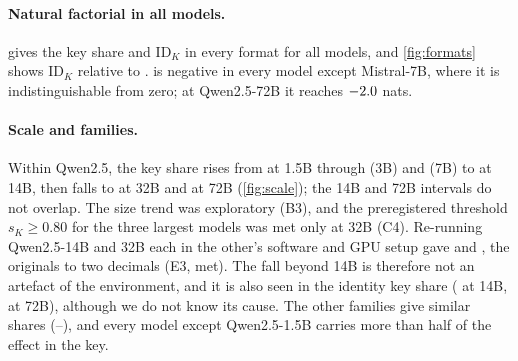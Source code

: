 \paragraph{Natural factorial in all models.}  gives the \fmtOpt{} key share and $\mathrm{ID}_K$ in every format for all \nModels{} models, and \cref{fig:formats} shows $\mathrm{ID}_K$ relative to \fmtOpt{}. \fmtBefore{} is negative in every model except Mistral-7B, where it is indistinguishable from zero; at Qwen2.5-72B it reaches $-2.0$ nats.

\begin{table}[!ht]
\centering
\caption{\textbf{Natural factorial, all models.} Key share $s_K$ under \fmtOpt{} and value identity carried by keys, $\mathrm{ID}_K$ (nats), in each format, with keys and values clamped from layer~0. $n = 150$ stories per format and model; 95\% bootstrap CIs over stories (ratio recomputed in each resample for $s_K$). Models ordered by size. Rows up to 14B are from GPU stage 1, whose predictions B1--B2 cover \fmtOpt{}, \fmtLetter{} and \fmtNone{} in Qwen2.5-3B/7B, Qwen3-8B, Mistral-7B and OLMo-2-7B; rows from 24B are from stage 2, whose prediction C4 covers $s_K$ and \fmtBefore{}. The other cells, including the 1.5B and 14B rows, are exploratory; preregistration A tested 1.5B in a separate run (\cref{tab:prereg-ab}).}
\label{tab:natural}
\resizebox{\textwidth}{!}{}
\end{table}

\paragraph{Scale and families.} Within Qwen2.5, the \fmtOpt{} key share rises from \shareQwenOnefive{} at 1.5B through \shareQwenThree{} (3B) and \shareQwenSeven{} (7B) to \shareQwenFourteen{} at 14B, then falls to \shareQwenThirtytwo{} at 32B and \shareQwenSeventytwo{} at 72B (\cref{fig:scale}); the 14B and 72B intervals do not overlap. The size trend was exploratory (B3), and the preregistered threshold $s_K \geq 0.80$ for the three largest models was met only at 32B (C4). Re-running Qwen2.5-14B and 32B each in the other's software and GPU setup gave \shareEnvFourteen{} and \shareEnvThirtytwo{}, the originals to two decimals (E3, met). The fall beyond 14B is therefore not an artefact of the environment, and it is also seen in the identity key share (\idShareOptQwenFourteen{} at 14B, \idShareOptQwenSeventytwo{} at 72B), although we do not know its cause. The other families give similar shares (\shareOlmoSeven{}--\shareMistralSeven{}), and every model except Qwen2.5-1.5B carries more than half of the \fmtOpt{} effect in the key.

